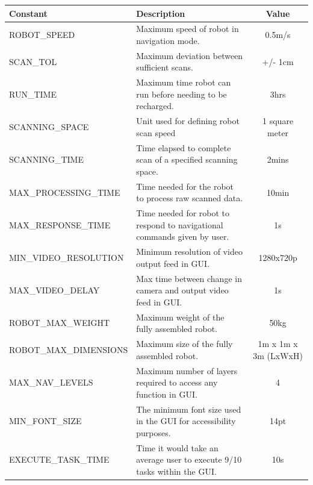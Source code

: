 \documentclass[12pt]{article}
\newcommand{\RobotSpeed}{0.5m/s}
\newcommand{\ScanTolerance}{+/- 1cm}
\newcommand{\BatteryLife}{3hrs}
\newcommand{\ScanningSpace}{1 square meter}
\newcommand{\ScanningTime}{2mins}
\newcommand{\MaxProcessingTime}{10min}
\newcommand{\MaxResponseTime}{1s}
\newcommand{\MinVideoResolution}{1280x720p}
\newcommand{\MaxVideoDelay}{1s}
\newcommand{\RobotMaxWeight}{50kg}
\newcommand{\RobotMaxDimensions}{1m x 1m x 3m (LxWxH)}
\newcommand{\MaxNavLevels}{4}
\newcommand{\MinFontSize}{14pt}
\newcommand{\ExecuteTaskTime}{10s}
\begin{document}



\begin{tabular}{ | l | p{6cm} | c |}
  \hline
  \textbf{Constant} & \textbf{Description} & \textbf{Value} \\
  \hline
  ROBOT\_SPEED & Maximum speed of robot in navigation mode. & \RobotSpeed{} \\
  \hline
  SCAN\_TOL & Maximum deviation between sufficient scans. & \ScanTolerance{} \\
  \hline
  RUN\_TIME & Maximum time robot can run before needing to be recharged. & \BatteryLife{} \\
  \hline
  SCANNING\_SPACE & Unit used for defining robot scan speed & \ScanningSpace{} \\
  \hline
  SCANNING\_TIME & Time elapsed to complete scan of a specified scanning space. & \ScanningTime{} \\
  \hline
  MAX\_PROCESSING\_TIME & Time needed for the robot to process raw scanned data. & \MaxProcessingTime{} \\
  \hline
  MAX\_RESPONSE\_TIME & Time needed for robot to respond to navigational commands given by user. & \MaxResponseTime{} \\
  \hline
  MIN\_VIDEO\_RESOLUTION & Minimum resolution of video output feed in GUI. & \MinVideoResolution{} \\
  \hline
  MAX\_VIDEO\_DELAY & Max time between change in camera and output video feed in GUI. & \MaxVideoDelay{} \\
  \hline
  ROBOT\_MAX\_WEIGHT & Maximum weight of the fully assembled robot. & \RobotMaxWeight{} \\
  \hline
  ROBOT\_MAX\_DIMENSIONS & Maximum size of the fully assembled robot. & \RobotMaxDimensions{} \\
  \hline
  MAX\_NAV\_LEVELS & Maximum number of layers required to access any function in GUI. & \MaxNavLevels{} \\
  \hline
  MIN\_FONT\_SIZE & The minimum font size used in the GUI for accessibility purposes. & \MinFontSize{} \\
  \hline
  EXECUTE\_TASK\_TIME & Time it would take an average user to execute 9/10 tasks within the GUI. & \ExecuteTaskTime{} \\
  \hline
  
\end{tabular}
\end{document}
